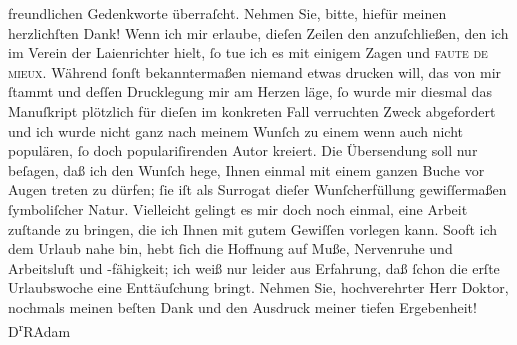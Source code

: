 \begin{ledgroupsized}[t]{13cm}
               freundlichen Gedenkworte überraſcht. Nehmen Sie, bitte, hiefür meinen herzlichſten
               Dank!\pend
           \pstart
           Wenn ich mir erlaube, dieſen Zeilen den \label{K_L02514-1v}\label{K_L02514-1h} anzuſchließen, den ich im Verein der Laienrichter hielt, ſo tue ich es mit einigem Zagen und \textsc{faute de mieux}. Während ſonſt bekanntermaßen niemand etwas
               drucken will, das von mir ſtammt und deſſen Drucklegung mir am Herzen läge, ſo wurde
               mir diesmal das Manuſkript plötzlich für dieſen im konkreten Fall verruchten Zweck
               abgefordert und ich wurde nicht ganz nach meinem Wunſch zu einem wenn auch nicht
               populären, ſo doch populariſirenden Autor kreiert. Die Übersendung soll nur beſagen,
               daß ich den Wunſch hege, Ihnen einmal mit einem ganzen Buche {\pb}vor Augen treten zu dürfen; ſie iſt als
               Surrogat dieſer Wunſcherfüllung gewiſſermaßen ſymboliſcher Natur.\pend
           \pstart
           Vielleicht gelingt es mir doch noch einmal, eine Arbeit zuſtande zu bringen, die ich
               Ihnen mit gutem Gewiſſen vorlegen kann. Sooft ich dem Urlaub nahe bin, hebt ſich die
               Hoffnung auf Muße, Nervenruhe und Arbeitsluſt und -fähigkeit; ich weiß nur leider aus
               Erfahrung, daß ſchon die erſte Urlaubswoche eine Enttäuſchung bringt.\pend
           \pstart
           Nehmen Sie, hochverehrter Herr Doktor, nochmals meinen beſten Dank und den Ausdruck
               meiner tiefen Ergebenheit!\pend
           \pstart \spacefill\mbox{D\textsuperscript{r}RAdam}\pend{}
         
         \endnumbering{}\end{ledgroupsized}  \newcommand{\dateiname}{L02514}\newcommand{\titel}{Robert Adam an Arthur Schnitzler, 22. 7. 1929}\newcommand{\editorInnen}{Martin Anton Müller und Gerd-Hermann Susen}
      